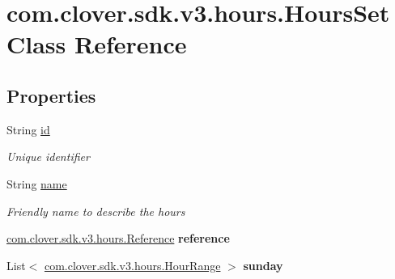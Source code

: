 \hypertarget{classcom_1_1clover_1_1sdk_1_1v3_1_1hours_1_1_hours_set}{}\section{com.\+clover.\+sdk.\+v3.\+hours.\+Hours\+Set Class Reference}
\label{classcom_1_1clover_1_1sdk_1_1v3_1_1hours_1_1_hours_set}
\subsection*{Properties}
\begin{DoxyCompactItemize}
\item 
String \hyperlink{classcom_1_1clover_1_1sdk_1_1v3_1_1hours_1_1_hours_set_ab5aa2ec031611b6befad44ebeb54e7ba}{id}
\begin{DoxyCompactList}\small\item\em Unique identifier \end{DoxyCompactList}\item 
String \hyperlink{classcom_1_1clover_1_1sdk_1_1v3_1_1hours_1_1_hours_set_a34262033dbac199a247904b789abae38}{name}
\begin{DoxyCompactList}\small\item\em Friendly name to describe the hours \end{DoxyCompactList}\item 
\mbox{\label{classcom_1_1clover_1_1sdk_1_1v3_1_1hours_1_1_hours_set_a9e0a2bf36cadec3d8ee9dd7e9328b1eb}} 
\hyperlink{classcom_1_1clover_1_1sdk_1_1v3_1_1hours_1_1_reference}{com.\+clover.\+sdk.\+v3.\+hours.\+Reference} {\bfseries reference}
\item 
\mbox{\label{classcom_1_1clover_1_1sdk_1_1v3_1_1hours_1_1_hours_set_a591c5cd08ac6bc3fcd6b5e8d45d233d8}} 
List$<$ \hyperlink{classcom_1_1clover_1_1sdk_1_1v3_1_1hours_1_1_hour_range}{com.\+clover.\+sdk.\+v3.\+hours.\+Hour\+Range} $>$ {\bfseries sunday}
\item 

\end{DoxyCompactItemize}
